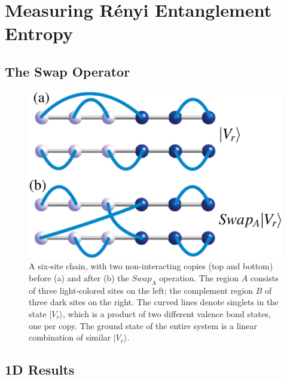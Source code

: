 \chapter{Measuring R\'{e}nyi Entanglement Entropy}
\section{The Swap Operator}

\begin{figure} {
\includegraphics[width=6.5 in]{./figures/paper2/fig_swap/swap_2.eps} 
\caption[Swap operator]{
\label{swap_2}
{\color{red}
A six-site chain, with two non-interacting copies (top and bottom) before
(a) and after (b) the $Swap_A$ operation. %
The region $A$ consists of three light-colored sites on the left; the
complement region $B$ of three dark sites on the right.  The curved lines denote
singlets in the state $|V_{r}\rangle$, which is a product of two
different valence bond states, one per copy.
The ground state of the entire system is a linear combination of similar $|V_{r}\rangle$.
}
}
} \end{figure}


\section{1D Results}

